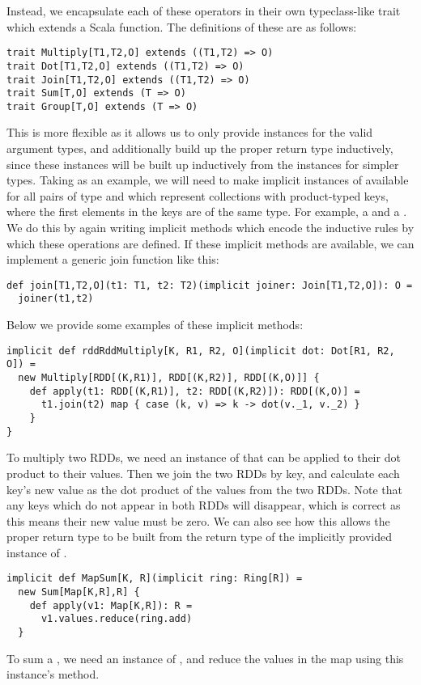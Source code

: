\vs Instead, we encapsulate each of these operators in their own typeclass-like trait which extends a Scala function. The definitions of these are as follows:
\vs\begin{lstlisting}
trait Multiply[T1,T2,O] extends ((T1,T2) => O)
trait Dot[T1,T2,O] extends ((T1,T2) => O)
trait Join[T1,T2,O] extends ((T1,T2) => O)
trait Sum[T,O] extends (T => O)
trait Group[T,O] extends (T => O)
\end{lstlisting}\vs
This is more flexible as it allows us to only provide instances for the valid argument types, and additionally build up the proper return type inductively, since these instances will be built up inductively from the instances for simpler types.
Taking  as an example, we will need to make implicit instances of available for all pairs of type  and  which represent collections with product-typed keys, where the first elements in the keys are of the same type. For example, a  and a . We do this by again writing implicit methods which encode the inductive rules by which these operations are defined. If these implicit methods are available, we can implement a generic join function like this:
\vs\begin{lstlisting}
def join[T1,T2,O](t1: T1, t2: T2)(implicit joiner: Join[T1,T2,O]): O =
  joiner(t1,t2)
\end{lstlisting}\vs
Below we provide some examples of these implicit methods:
\vs\begin{lstlisting}
implicit def rddRddMultiply[K, R1, R2, O](implicit dot: Dot[R1, R2, O]) =
  new Multiply[RDD[(K,R1)], RDD[(K,R2)], RDD[(K,O)]] {
    def apply(t1: RDD[(K,R1)], t2: RDD[(K,R2)]): RDD[(K,O)] = 
      t1.join(t2) map { case (k, v) => k -> dot(v._1, v._2) }
    }
}
\end{lstlisting}\vs
To multiply two RDDs, we need an instance of  that can be applied to their dot product to their values. Then we join the two RDDs by key, and calculate each key's new value as the dot product of the values from the two RDDs. Note that any keys which do not appear in both RDDs will disappear, which is correct as this means their new value must be zero. We can also see how this allows the proper return type to be built from the return type  of the implicitly provided instance of .
\vs\begin{lstlisting}
implicit def MapSum[K, R](implicit ring: Ring[R]) =
  new Sum[Map[K,R],R] {
    def apply(v1: Map[K,R]): R =
      v1.values.reduce(ring.add)
  }
\end{lstlisting}\vs
To sum a , we need an instance of , and reduce the values in the map using this instance's  method.

